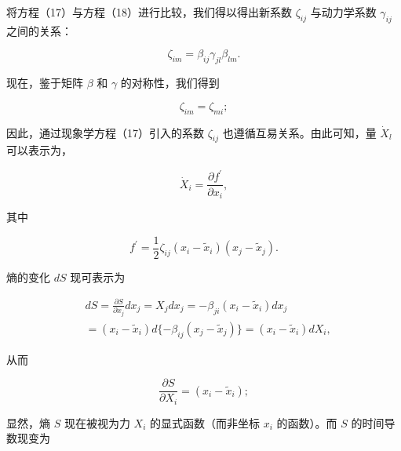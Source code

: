 将方程（17）与方程（18）进行比较，我们得以得出新系数 \(\zeta_{ij}\) 与动力学系数 \(\gamma_{ij}\) 之间的关系：

\begin{equation}\tag{15.6.47}\label{eq:15.6.47}
\zeta _ { i m } = \beta _ { i j } \gamma _ { j l } \beta _ { l m } .
\end{equation}

现在，鉴于矩阵 \(\beta\) 和 \(\gamma\) 的对称性，我们得到

\begin{equation}\tag{15.6.48}\label{eq:15.6.48}
\zeta _ { i m } = \zeta _ { m i } ;
\end{equation}

因此，通过现象学方程（17）引入的系数 \(\zeta_{ij}\) 也遵循互易关系。由此可知，量 \(\dot{X}_{l}\) 可以表示为，

\begin{equation}\tag{15.6.49}\label{eq:15.6.49}
\dot { X } _ { i } = \frac { \partial f ^{\prime} } { \partial x _ { i } } ,
\end{equation}

其中

\begin{equation}\tag{15.6.50}\label{eq:15.6.50}
f ^{\prime} = \frac { 1 } { 2 } \zeta _ { i j } ( x _ { i } - \tilde { x } _ { i } ) ( x _ { j } - \tilde { x } _ { j } ) .
\end{equation}

熵的变化 \(dS\) 现可表示为

\begin{equation}\tag{15.6.51}\label{eq:15.6.51}
\begin{array}{rl} & { d S = \frac { \partial S } { \partial x _ { j } } d x _ { j } = X _ { j } d x _ { j } = - \beta _ { j i } ( x _ { i } - \tilde { x } _ { i } ) d x _ { j } } \\& {  = ( x _ { i } - \tilde { x } _ { i } ) d \{ - \beta _ { i j } ( x _ { j } - \tilde { x } _ { j } ) \} = ( x _ { i } - \tilde { x } _ { i } ) d X _ { i } , } \end{array}
\end{equation}

从而

\begin{equation}\tag{15.6.52}\label{eq:15.6.52}
\frac { \partial S } { \partial X _ { i } } = ( x _ { i } - \tilde { x } _ { i } ) ;
\end{equation}

显然，熵 \(S\) 现在被视为力 \(X_i\) 的显式函数（而非坐标 \(x_i\) 的函数）。而 \(S\) 的时间导数现变为

